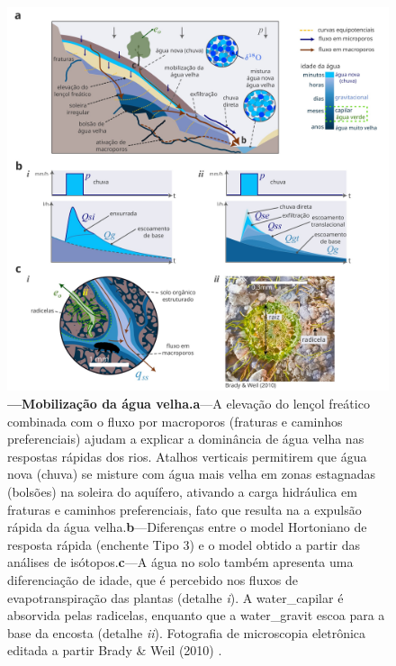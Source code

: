 \documentclass[./main.tex]{subfiles}
\begin{document}
\begin{figure}[t!] 
\centering				
\includegraphics[width=0.98\linewidth]{figs/fig_paradox.jpg}		
\caption[Mobilização da água velha]
{\textbf{---\;Mobilização da água velha.}\;\textbf{a}\;---\;A elevação do lençol freático combinada com o fluxo por macroporos (fraturas e caminhos preferenciais) ajudam a explicar a dominância de água velha nas respostas rápidas dos rios. Atalhos verticais permitirem que água nova (chuva) se misture com água mais velha em zonas estagnadas (bolsões) na soleira do aquífero, ativando a carga hidráulica em fraturas e caminhos preferenciais, fato que resulta na a expulsão rápida da água velha.\;\textbf{b}\;---\;Diferenças entre o \gls{model} Hortoniano de resposta rápida (enchente Tipo 3) e o \gls{model} obtido a partir das análises de isótopos.\;\textbf{c}\;---\;A água no solo também apresenta uma diferenciação de idade, que é percebido nos fluxos de evapotranspiração das plantas (detalhe \textrm{\textit{i}}). A \gls{water_capilar} é absorvida pelas radicelas, enquanto que a \gls{water_gravit} escoa para a base da encosta (detalhe \textrm{\textit{ii}}). Fotografia de microscopia eletrônica editada a partir Brady \& Weil (2010) \cite{brady2010}. 
}
\label{fig:hydro:paradox} 		
\end{figure}
\end{document}
